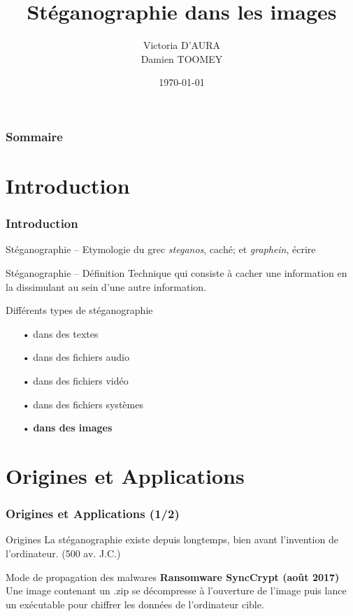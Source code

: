 \documentclass{beamer}
\title{Stéganographie dans les images}
\author[VD \--- DT]{Victoria D'AURA \\ Damien TOOMEY}
\institute[INSA Rouen]{INSA \--- Institut National des Sciences Appliquées de Rouen}
\date{\today}
\newif\ifplacelogo %
\begin{document}
\begin{frame}
\titlepage
\end{frame}
\placelogofalse
\begin{frame}
\frametitle{Sommaire} 
\tableofcontents
\end{frame}	

\section{Introduction}
\begin{frame}
\frametitle{Introduction} 

\begin{block}{Stéganographie \--- Etymologie}
du grec \emph{steganos}, caché; et \emph{graphein}, écrire \\
\end{block}

\begin{block}{Stéganographie \--- Définition}
Technique qui consiste à cacher une information en la dissimulant au sein d'une autre information.
\end{block}

\begin{block}{Différents types de stéganographie}
\begin{itemize}
    \item[•] dans des textes
    \item[•] dans des fichiers audio
    \item[•] dans des fichiers vidéo
    \item[•] dans des fichiers systèmes
    \item[•] \textbf{dans des images}
\end{itemize}
\end{block}
\end{frame}

\section{Origines et Applications}
\begin{frame}
\frametitle{Origines et Applications (1/2)} 

\begin{block}{Origines}
La stéganographie existe depuis longtemps, bien avant l'invention de l'ordinateur. (500 av. J.C.)
\end{block}


\begin{block}{Mode de propagation des malwares}
\textbf{Ransomware SyncCrypt (août 2017)} \\
Une image contenant un .zip se décompresse à l'ouverture de l'image puis lance un exécutable pour chiffrer les données de l'ordinateur cible.
\end{block}
\end{frame}
\end{document}
